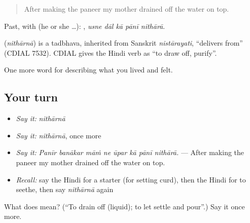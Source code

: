 \begin{quote}
After making the paneer my mother drained off the water on top.
\end{quote}

Past, with  (he or she …):     , \emph{usne dāl kā pānī nithārā}.

\begin{cousinweb}
\textbf{} (\emph{nithārnā}) is a tadbhava, inherited from Sanskrit \emph{nistārayati}, \textquotedblleft{}delivers from\textquotedblright{} (CDIAL 7532). CDIAL gives the Hindi verb as \textquotedblleft{}to draw off, purify\textquotedblright{}.
\end{cousinweb}

\begin{grammarlens}[title={What you've built}]
One more word for describing what you lived and felt.
\end{grammarlens}

\subsection*{Your turn}
\begin{itemize}
\raggedright
  \item \emph{Say it:} \emph{nithārnā}
  \item \emph{Say it:} \emph{nithārnā}, once more
  \item \emph{Say it:} \emph{Panīr banākar māṁ ne ūpar kā pānī nithārā.} — After making the paneer my mother drained off the water on top.
  \item \emph{Recall:} say the Hindi for a starter (for setting curd), then the Hindi for to seethe, then say \emph{nithārnā} again
\end{itemize}

\begin{tcolorbox}[breakable,colback=teal!4,colframe=teal!35!black,title={Before you move on}]
What does  mean? (\textquotedblleft{}To drain off (liquid); to let settle and pour\textquotedblright{}.) Say it once more.
\end{tcolorbox}
